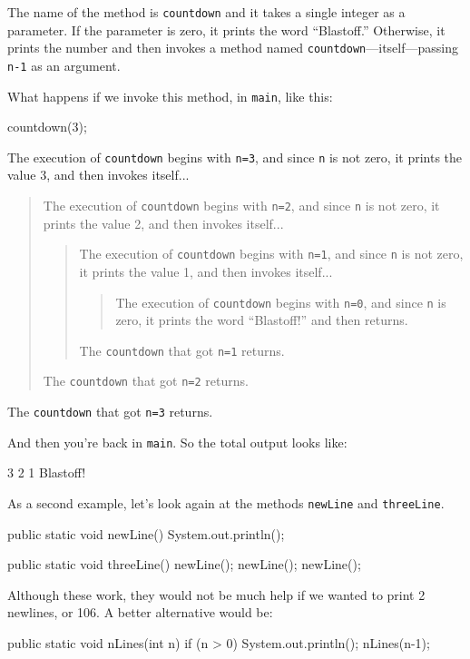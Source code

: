 The name of the method is {\tt countdown} and it takes a single integer as a parameter.
If the parameter is zero, it prints the word ``Blastoff.''
Otherwise, it prints the number and then invokes a method named {\tt countdown}---itself---passing {\tt n-1} as an argument.

What happens if we invoke this method, in {\tt main}, like this:

\begin{code}
    countdown(3);
\end{code}

The execution of {\tt countdown} begins with {\tt n=3}, and since {\tt n} is not zero, it prints the value 3, and then invokes itself...
\begin{quote}
The execution of {\tt countdown} begins with {\tt n=2}, and since {\tt n} is not zero, it prints the value 2, and then invokes itself...
\begin{quote}
The execution of {\tt countdown} begins with {\tt n=1}, and since {\tt n} is not zero, it prints the value 1, and then invokes itself...
\begin{quote}
The execution of {\tt countdown} begins with {\tt n=0}, and since {\tt n} is zero, it prints the word ``Blastoff!'' and then returns.
\end{quote}
The {\tt countdown} that got {\tt n=1} returns.
\end{quote}
The {\tt countdown} that got {\tt n=2} returns.
\end{quote}
The {\tt countdown} that got {\tt n=3} returns.

\noindent And then you're back in {\tt main}.
So the total output looks like:

\begin{stdout}
3
2
1
Blastoff!
\end{stdout}

As a second example, let's look again at the methods {\tt newLine} and {\tt threeLine}.

\begin{code}
    public static void newLine() {
        System.out.println();
    }

    public static void threeLine() {
        newLine();
        newLine();
        newLine();
    }
\end{code}

Although these work, they would not be much help if we wanted to print 2 newlines, or 106.
A better alternative would be:

\begin{code}
    public static void nLines(int n) {
        if (n > 0) {
            System.out.println();
            nLines(n-1);
        }
    }
\end{code}

